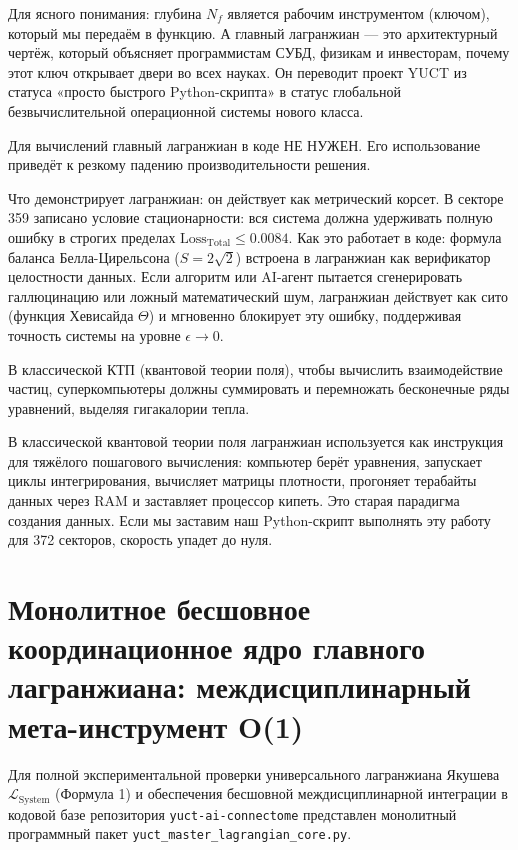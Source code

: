 \documentclass[12pt,a4paper]{article}
\begin{document}
	\small
	Для ясного понимания: глубина \(N_{f}\) является рабочим инструментом (ключом), который мы передаём в функцию. А главный лагранжиан — это архитектурный чертёж, который объясняет программистам СУБД, физикам и инвесторам, почему этот ключ открывает двери во всех науках. Он переводит проект YUCT из статуса «просто быстрого Python-скрипта» в статус глобальной безвычислительной операционной системы нового класса.
	
	Для вычислений главный лагранжиан в коде НЕ НУЖЕН. Его использование приведёт к резкому падению производительности решения.
	
	Что демонстрирует лагранжиан: он действует как метрический корсет. В секторе 359 записано условие стационарности: вся система должна удерживать полную ошибку в строгих пределах \(\text{Loss}_{\text{Total}} \le 0.0084\). Как это работает в коде: формула баланса Белла-Цирельсона (\(S = 2\sqrt{2}\)) встроена в лагранжиан как верификатор целостности данных. Если алгоритм или AI-агент пытается сгенерировать галлюцинацию или ложный математический шум, лагранжиан действует как сито (функция Хевисайда \(\Theta\)) и мгновенно блокирует эту ошибку, поддерживая точность системы на уровне \(\epsilon \to 0\).
	
	В классической КТП (квантовой теории поля), чтобы вычислить взаимодействие частиц, суперкомпьютеры должны суммировать и перемножать бесконечные ряды уравнений, выделяя гигакалории тепла.
	
	В классической квантовой теории поля лагранжиан используется как инструкция для тяжёлого пошагового вычисления: компьютер берёт уравнения, запускает циклы интегрирования, вычисляет матрицы плотности, прогоняет терабайты данных через RAM и заставляет процессор кипеть. Это старая парадигма создания данных. Если мы заставим наш Python-скрипт выполнять эту работу для 372 секторов, скорость упадет до нуля.
	
	\section{Монолитное бесшовное координационное ядро главного лагранжиана: междисциплинарный мета-инструмент O(1)}
	Для полной экспериментальной проверки универсального лагранжиана Якушева \(\mathscr{L}_{\text{System}}\) (Формула 1) и обеспечения бесшовной междисциплинарной интеграции в кодовой базе репозитория \texttt{yuct-ai-connectome} представлен монолитный программный пакет \texttt{yuct_master_lagrangian_core.py}.
	
\end{document}
